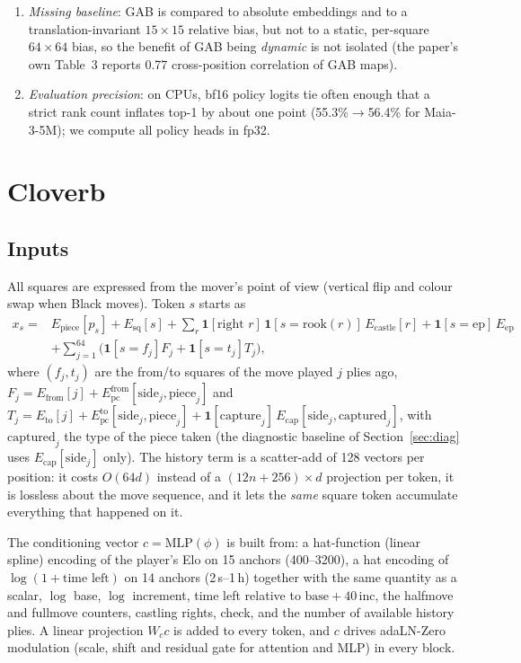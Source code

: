 \begin{enumerate}
cannot be loaded by the released code; the value head is $d$ wide, not 128; ``all code and data''
is open-sourced but no training code or data is.
\item \emph{Missing baseline}: GAB is compared to absolute embeddings and to a translation-invariant
$15\times15$ relative bias, but not to a static, per-square $64\times64$ bias, so the benefit of GAB
being \emph{dynamic} is not isolated (the paper's own Table~3 reports 0.77 cross-position correlation
of GAB maps).
\item \emph{Evaluation precision}: on CPUs, bf16 policy logits tie often enough that a strict rank
count inflates top-1 by about one point (55.3\%$\to$56.4\% for Maia-3-5M); we compute all policy heads
in fp32.
\end{enumerate}

\section{Cloverb}
\subsection{Inputs}
All squares are expressed from the mover's point of view (vertical flip and colour swap when Black
moves). Token $s$ starts as
\[
\begin{aligned}
x_s = {} & E_{\text{piece}}[p_s] + E_{\text{sq}}[s]
 + \textstyle\sum_{r} \mathbf{1}[\text{right } r]\,\mathbf{1}[s = \text{rook}(r)]\,E_{\text{castle}}[r]
 + \mathbf{1}[s=\text{ep}]\,E_{\text{ep}}\\
 & + \textstyle\sum_{j=1}^{64} \big(\mathbf{1}[s=f_j] F_j + \mathbf{1}[s=t_j] T_j\big),
\end{aligned}
\]
where $(f_j,t_j)$ are the from/to squares of the move played $j$ plies ago,
$F_j = E_{\text{from}}[j] + E_{\text{pc}}^{\text{from}}[\text{side}_j,\text{piece}_j]$ and
$T_j = E_{\text{to}}[j] + E_{\text{pc}}^{\text{to}}[\text{side}_j,\text{piece}_j] + \mathbf{1}[\text{capture}_j]\,E_{\text{cap}}[\text{side}_j,\text{captured}_j]$,
with $\text{captured}_j$ the type of the piece taken (the diagnostic baseline of
Section~\ref{sec:diag} uses $E_{\text{cap}}[\text{side}_j]$ only). The history term is a scatter-add of 128 vectors per position: it costs $O(64d)$ instead of a
$(12n{+}256)\times d$ projection per token, it is lossless about the move sequence, and it lets the
\emph{same} square token accumulate everything that happened on it.

The conditioning vector $c=\mathrm{MLP}(\phi)$ is built from: a hat-function (linear spline)
encoding of the player's Elo on 15 anchors (400--3200), a hat encoding of $\log(1+\text{time left})$
on 14 anchors (2\,s--1\,h) together with the same quantity as a scalar, $\log$ base, $\log$ increment,
time left relative to $\text{base}+40\,\text{inc}$, the halfmove and fullmove counters, castling
rights, check, and the number of available history plies. A linear projection $W_c c$ is added to
every token, and $c$ drives adaLN-Zero modulation (scale, shift and residual gate for attention and
MLP) in every block.

